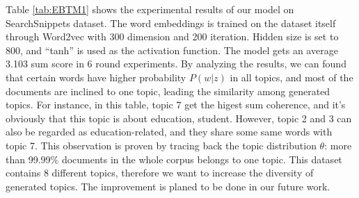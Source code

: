 Table \ref{tab:EBTM1} shows the experimental results of our model on SearchSnippets dataset. The word embeddings is trained on the dataset itself through Word2vec with 300 dimension and 200 iteration. Hidden size is set to 800, and ``tanh'' is used as the activation function. The model gets an average 3.103 sum score in 6 round experiments. By analyzing the results, we can found that certain words have higher probability $P(w|z)$ in all topics, and most of the documents are inclined to one topic, leading the similarity among generated topics. For instance, in this table, topic 7 get the higest sum coherence, and it's obviously that this topic is about education, student. However, topic 2 and 3 can also be regarded as education-related, and they share some same words with topic 7. This observation is proven by tracing back the topic distribution $\theta$: more than 99.99\% documents in the whole corpus belongs to one topic. 
This dataset contains 8 different topics, therefore we want to increase the diversity of generated topics. The improvement is planed to be done in our future work.


